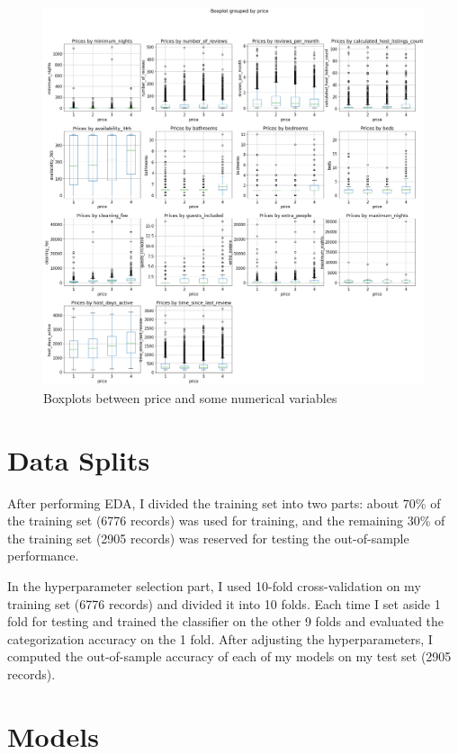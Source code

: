 \documentclass[11pt]{article}
\begin{document}
\begin{figure}[H]
    \caption{Boxplots between price and some numerical variables}
    \label{numerical}
    \centering
    \includegraphics[width=1.15\textwidth]{../img/numerical.png}
\end{figure}


\section{Data Splits}

After performing EDA, I divided the training set into two parts: about 70\% of the training set (6776 records) was used for training, and the remaining 30\% of the training set (2905 records) was reserved for testing the out-of-sample performance. 

In the hyperparameter selection part, I used 10-fold cross-validation on my training set (6776 records) and divided it into 10 folds. Each time I set aside 1 fold for testing and trained the classifier on the other 9 folds and evaluated the categorization accuracy on the 1 fold. After adjusting the hyperparameters, I computed the out-of-sample accuracy of each of my models on my test set (2905 records).

\section{Models}
\end{document}
